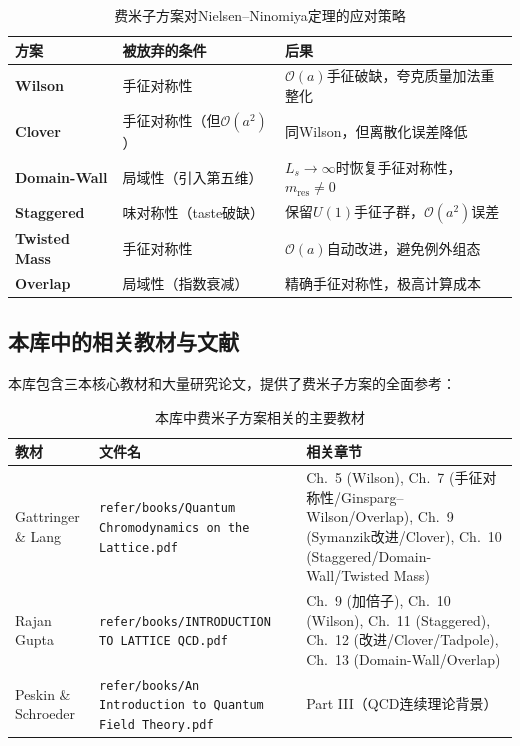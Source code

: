 \documentclass[12pt,a4paper]{ctexart}
\theoremstyle{definition}
\begin{document}
\begin{table}[H]
\centering
\caption{费米子方案对Nielsen--Ninomiya定理的应对策略}
\label{tab:NN_theorem_strategies}
\begin{tabular}{lp{4.5cm}p{5.5cm}}
\toprule
方案 & 被放弃的条件 & 后果 \\
\midrule
\textbf{Wilson} & 手征对称性 & $\mathcal{O}(a)$手征破缺，夸克质量加法重整化 \\
\textbf{Clover} & 手征对称性（但$\mathcal{O}(a^2)$） & 同Wilson，但离散化误差降低 \\
\textbf{Domain-Wall} & 局域性（引入第五维） & $L_s\to\infty$时恢复手征对称性，$m_{\text{res}}\neq 0$ \\
\textbf{Staggered} & 味对称性（taste破缺） & 保留$U(1)$手征子群，$\mathcal{O}(a^2)$误差 \\
\textbf{Twisted Mass} & 手征对称性 & $\mathcal{O}(a)$自动改进，避免例外组态 \\
\textbf{Overlap} & 局域性（指数衰减） & 精确手征对称性，极高计算成本 \\
\bottomrule
\end{tabular}
\end{table}

\subsection{本库中的相关教材与文献}

本库包含三本核心教材和大量研究论文，提供了费米子方案的全面参考：

\begin{table}[H]
\centering
\caption{本库中费米子方案相关的主要教材}
\label{tab:textbooks}
\small
\begin{tabular}{lp{6cm}l}
\toprule
教材 & 文件名 & 相关章节 \\
\midrule
Gattringer \& Lang & \texttt{refer/books/Quantum Chromodynamics on the Lattice.pdf} &
Ch.~5 (Wilson), Ch.~7 (手征对称性/Ginsparg--Wilson/Overlap), Ch.~9 (Symanzik改进/Clover), Ch.~10 (Staggered/Domain-Wall/Twisted Mass) \\

Rajan Gupta & \texttt{refer/books/INTRODUCTION TO LATTICE QCD.pdf} &
Ch.~9 (加倍子), Ch.~10 (Wilson), Ch.~11 (Staggered), Ch.~12 (改进/Clover/Tadpole), Ch.~13 (Domain-Wall/Overlap) \\

Peskin \& Schroeder & \texttt{refer/books/An Introduction to Quantum Field Theory.pdf} &
Part III（QCD连续理论背景）\\
\bottomrule
\end{tabular}
\end{table}
\end{document}

